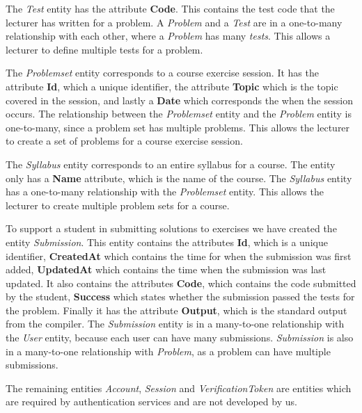 The \textit{Test} entity has the attribute \textbf{Code}. This contains the test code that the lecturer has written for a problem. A \textit{Problem} and a \textit{Test} are in a one-to-many relationship with each other, where a \textit{Problem} has many \textit{tests}. This allows a lecturer to define multiple tests for a problem.

The \textit{Problemset} entity corresponds to a course exercise session. It has the attribute \textbf{Id}, which a unique identifier, the attribute \textbf{Topic} which is the topic covered in the session, and lastly a \textbf{Date} which corresponds the when the session occurs. The relationship between the \textit{Problemset} entity and the \textit{Problem} entity is one-to-many, since a problem set has multiple problems. This allows the lecturer to create a set of problems for a course exercise session.

The \textit{Syllabus} entity corresponds to an entire syllabus for a course. The entity only has a \textbf{Name} attribute, which is the name of the course. The \textit{Syllabus} entity has a one-to-many relationship with the \textit{Problemset} entity. This allows the lecturer to create multiple problem sets for a course.

To support a student in submitting solutions to exercises we have created the entity \textit{Submission}. This entity contains the attributes \textbf{Id}, which is a unique identifier, \textbf{CreatedAt} which contains the time for when the submission was first added, \textbf{UpdatedAt} which contains the time when the submission was last updated. It also contains the attributes \textbf{Code}, which contains the code submitted by the student, \textbf{Success} which states whether the submission passed the tests for the problem. Finally it has the attribute \textbf{Output}, which is the standard output from the compiler.
The \textit{Submission} entity is in a many-to-one relationship with the \textit{User} entity, because each user can have many submissions. \textit{Submission} is also in a many-to-one relationship with \textit{Problem}, as a problem can have multiple submissions.

The remaining entities \textit{Account}, \textit{Session} and \textit{VerificationToken} are entities which are required by authentication services and are not developed by us.

